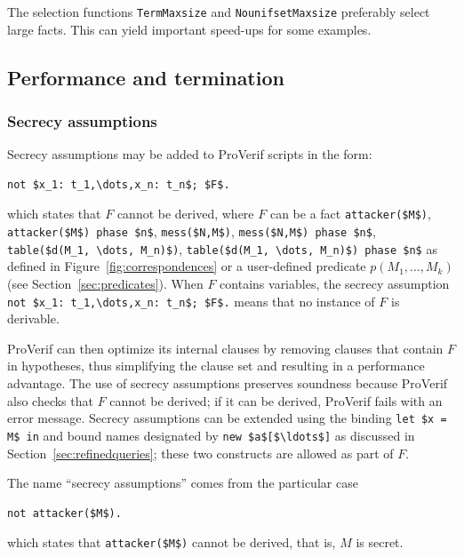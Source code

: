 \documentclass{book}
\begin{document}
The selection functions \lstinline{TermMaxsize} and
\lstinline{NounifsetMaxsize} preferably select large facts. This can
yield important speed-ups for some examples.

\subsection{Performance and termination}

\subsubsection{Secrecy assumptions} \label{sec:secrecyassumptions}

Secrecy assumptions may be added to ProVerif scripts in the form:
%
\begin{lstlisting}[numbers=none]
	not $x_1: t_1,\dots,x_n: t_n$; $F$.
\end{lstlisting}
%
which states that $F$ cannot be derived, where $F$ can be a fact \lstinline!attacker($M$)!,
\lstinline!attacker($M$) phase $n$!, \lstinline!mess($N,M$)!, \lstinline!mess($N,M$) phase $n$!,
\lstinline!table($d(M_1, \dots, M_n)$)!, \lstinline!table($d(M_1, \dots, M_n)$) phase $n$!
as defined in Figure~\ref{fig:correspondences} or a user-defined predicate $p(M_1,\dots,M_k)$ (see Section~\ref{sec:predicates}).
When $F$ contains variables, the secrecy assumption \lstinline!not $x_1: t_1,\dots,x_n: t_n$; $F$.! means that no instance of $F$ is derivable.

ProVerif can then optimize its internal clauses by removing clauses that contain $F$ in hypotheses, thus simplifying the clause set and resulting in a performance advantage. The use of secrecy assumptions preserves soundness because ProVerif also checks that $F$ cannot be derived; if it can be derived, ProVerif fails with an error message. Secrecy assumptions can be extended using the binding \lstinline!let $x = M$ in! and bound names designated by \lstinline{new $a$[$\ldots$]} as discussed in Section~\ref{sec:refinedqueries}; these two constructs are allowed as part of $F$.

The name ``secrecy assumptions'' comes from the particular case
\begin{lstlisting}[numbers=none]
	not attacker($M$).
\end{lstlisting}
which states that \lstinline!attacker($M$)! cannot be derived, that is, $M$ is secret.
\end{document}
